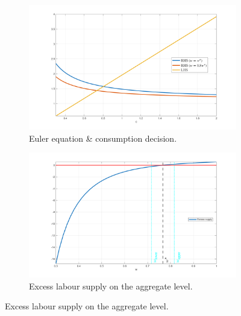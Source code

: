 \begin{figure}[hbt]
\centering
\caption{Household block of the model.}
\begin{subfigure}{.5\textwidth}
  \centering
  \caption{Euler equation \& consumption decision.}
  \includegraphics[width=\linewidth]{_figures/consumption_plot.png}
\end{subfigure}%
\begin{subfigure}{.5\textwidth}
  \centering
    \caption{Excess labour supply on the aggregate level.}
    \label{fig:a1_bisection}
  \includegraphics[width=\linewidth]{_figures/excess_supply_bisection.png}
\end{subfigure}
\end{figure}	
